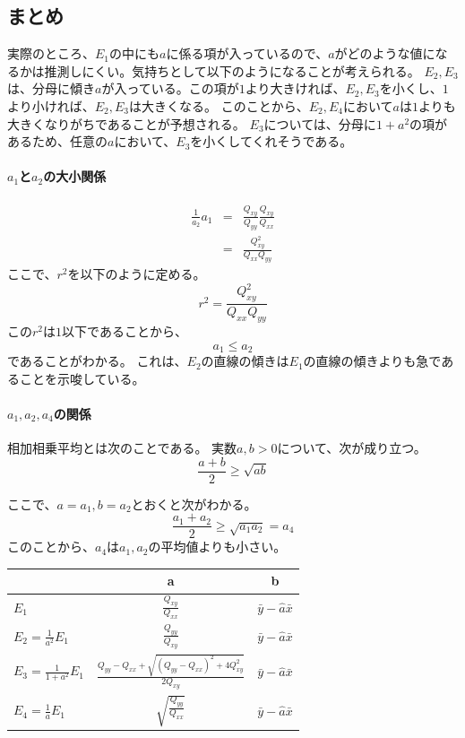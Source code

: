 \subsection{まとめ}
実際のところ、$E_1$の中にも$a$に係る項が入っているので、$a$がどのような値になるかは推測しにくい。気持ちとして以下のようになることが考えられる。
$E_2,E_3$は、分母に傾き$a$が入っている。この項が$1$より大きければ、$E_2,E_3$を小くし、$1$より小ければ、$E_2,E_3$は大きくなる。
このことから、$E_2,E_4$において$a$は$1$よりも大きくなりがちであることが予想される。
$E_3$については、分母に$1+a^2$の項があるため、任意の$a$において、$E_3$を小くしてくれそうである。

\paragraph{$a_1$と$a_2$の大小関係}
\begin{eqnarray*}
 \frac{1}{a_2}a_1 &=& \frac{Q_{xy}}{Q_{yy}}\frac{Q_{xy}}{Q_{xx}} \\
 &=& \frac{Q^2_{xy}}{Q_{xx}Q_{yy}}
\end{eqnarray*}
ここで、$r^2$を以下のように定める。
\begin{equation*}
 r^2 = \frac{Q^2_{xy}}{Q_{xx}Q_{yy}}
\end{equation*}
この$r^2$は$1$以下であることから、
\begin{equation*}
 a_1 \leq a_2
\end{equation*}
であることがわかる。
これは、$E_2$の直線の傾きは$E_1$の直線の傾きよりも急であることを示唆している。

\paragraph{$a_1,a_2,a_4$の関係}
相加相乗平均とは次のことである。
実数$a,b>0$について、次が成り立つ。
\begin{equation*}
 \frac{a+b}{2} \geq \sqrt{ab}
\end{equation*}

ここで、$a=a_1,b=a_2$とおくと次がわかる。
\begin{equation*}
 \frac{a_1+a_2}{2}  \geq  \sqrt{a_1 a_2} = a_4
\end{equation*}
このことから、$a_4$は$a_1,a_2$の平均値よりも小さい。



\begin{table}[http]
 \centering
 \begin{tabular}{lcc}
  & a & b\\
  \hline 
  $E_1$ & $\frac{Q_{xy}}{Q_{xx}}$  &$\bar{y}-\hat{a}\bar{x}$ \\
  $E_2=\frac{1}{a^2}E_1$ & $\frac{Q_{yy}}{Q_{xy}}$ & $\bar{y}-\hat{a}\bar{x}$ \\
$E_3=\frac{1}{1+a^2}E_1$ & $\frac{Q_{yy}-Q_{xx}+\sqrt{(Q_{yy}-Q_{xx})^2+4Q_{xy}^2}}{2Q_{xy}}$ & $\bar{y}-\hat{a}\bar{x}$ \\
  $E_4=\frac{1}{a}E_1$ & $\sqrt{\frac{Q_{yy}}{Q_{xx}}}$ & $\bar{y}-\hat{a}\bar{x}$
 \end{tabular}
\end{table}


